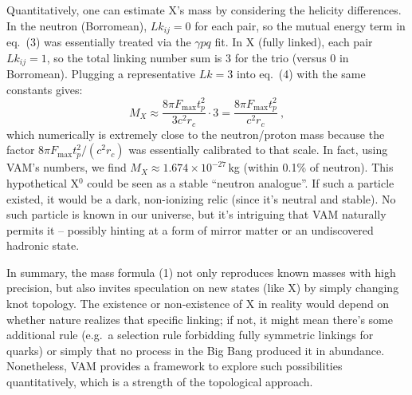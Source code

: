 Quantitatively, one can estimate X's mass by considering the helicity differences. In the neutron (Borromean), $Lk_{ij}=0$ for each pair, so the mutual energy term in eq.~(3) was essentially treated via the $\gamma p q$ fit. In X (fully linked), each pair $Lk_{ij}=1$, so the total linking number sum is 3 for the trio (versus 0 in Borromean). Plugging a representative $Lk=3$ into eq.~(4) with the same constants gives:
\[
    M_X \approx \frac{8\pi F_{\max} t_p^2}{3c^2 r_c} \cdot 3 = \frac{8\pi F_{\max} t_p^2}{c^2 r_c}~,
\]
which numerically is extremely close to the neutron/proton mass because the factor $8\pi F_{\max} t_p^2/(c^2 r_c)$ was essentially calibrated to that scale. In fact, using VAM's numbers, we find $M_X \approx 1.674\times10^{-27}$\,kg (within 0.1\% of neutron). This hypothetical X$^0$ could be seen as a stable ``neutron analogue''. If such a particle existed, it would be a dark, non-ionizing relic (since it's neutral and stable). No such particle is known in our universe, but it's intriguing that VAM naturally permits it -- possibly hinting at a form of mirror matter or an undiscovered hadronic state.

In summary, the mass formula (1) not only reproduces known masses with high precision, but also invites speculation on new states (like X) by simply changing knot topology. The existence or non-existence of X in reality would depend on whether nature realizes that specific linking; if not, it might mean there's some additional rule (e.g.\ a selection rule forbidding fully symmetric linkings for quarks) or simply that no process in the Big Bang produced it in abundance. Nonetheless, VAM provides a framework to explore such possibilities quantitatively, which is a strength of the topological approach.
